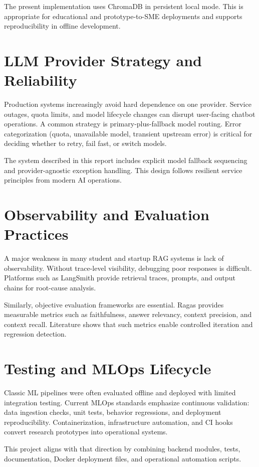 \documentclass[12pt,letterpaper]{report}
\begin{document}
The present implementation uses ChromaDB in persistent local mode. This is appropriate for educational and prototype-to-SME deployments and supports reproducibility in offline development.

\section{LLM Provider Strategy and Reliability}
Production systems increasingly avoid hard dependence on one provider. Service outages, quota limits, and model lifecycle changes can disrupt user-facing chatbot operations. A common strategy is primary-plus-fallback model routing. Error categorization (quota, unavailable model, transient upstream error) is critical for deciding whether to retry, fail fast, or switch models.

The system described in this report includes explicit model fallback sequencing and provider-agnostic exception handling. This design follows resilient service principles from modern AI operations.

\section{Observability and Evaluation Practices}
A major weakness in many student and startup RAG systems is lack of observability. Without trace-level visibility, debugging poor responses is difficult. Platforms such as LangSmith provide retrieval traces, prompts, and output chains for root-cause analysis.

Similarly, objective evaluation frameworks are essential. Ragas provides measurable metrics such as faithfulness, answer relevancy, context precision, and context recall. Literature shows that such metrics enable controlled iteration and regression detection.

\section{Testing and MLOps Lifecycle}
Classic ML pipelines were often evaluated offline and deployed with limited integration testing. Current MLOps standards emphasize continuous validation: data ingestion checks, unit tests, behavior regressions, and deployment reproducibility. Containerization, infrastructure automation, and CI hooks convert research prototypes into operational systems.

This project aligns with that direction by combining backend modules, tests, documentation, Docker deployment files, and operational automation scripts.
\end{document}
